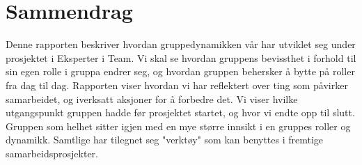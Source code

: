 \chapter*{Sammendrag}
Denne rapporten beskriver hvordan gruppedynamikken vår har utviklet seg under prosjektet i Eksperter i Team.
Vi skal se hvordan gruppens bevissthet i forhold til sin egen rolle i gruppa endrer seg, og hvordan gruppen behersker å bytte på roller fra dag til dag.
Rapporten viser hvordan vi har reflektert over ting som påvirker samarbeidet, og iverksatt aksjoner for å forbedre det. 
Vi viser hvilke utgangspunkt gruppen hadde før prosjektet startet, og hvor vi endte opp til slutt. 
Gruppen som helhet sitter igjen med en mye større innsikt i en gruppes roller og dynamikk. Samtlige har tilegnet seg "verktøy" som kan benyttes i fremtige samarbeidsprosjekter. 